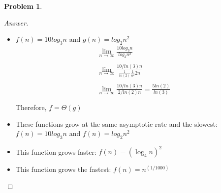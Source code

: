 \documentclass[11pt]{article}
\theoremstyle{definition}
\theoremstyle{definition}
\newtheorem{required}{Problem}
\theoremstyle{definition}
\begin{document}
\begin{required}
\begin{enumerate} [label=(\alph*)]
\begin{proof}[Answer]
\begin{itemize}
\begin{align*}
             \frac{-1}{2(ln(2))^2}\lim_{n \to \infty} \frac{1}{n^{2.001}}= 0 \\
        \end{align*}
        Therefore, $f=O(g)$
        \item $f(n) = 10log_3n$ and $g(n) = log_2n^2$
        \begin{align*}
            \lim_{n \to \infty} \frac{10log_3n}{log_2n^2} \\ \\
             \lim_{n \to \infty} \frac{10/ln(3)n}{\frac{1}{ln(2)}\frac{1}{n^2}2n} \\ \\
             \lim_{n \to \infty} \frac{10/ln(3)n}{2/ln(2)n} = \frac{5ln(2)}{ln(3)}\\ \\
        \end{align*}
        Therefore, $f = \Theta (g)$
    \end{itemize}
    \begin{itemize}
    \item These functions grow at the same asymptotic rate and the slowest:  $f(n) = 10log_3n$ and $f(n) = log_2n^2$
    \item This function grows faster: $f(n) = (\log_4 n)^2$
    \item This function grows the fastest: $f(n) = n ^ {(1/1000)}$
    \end{itemize}
    \end{proof}
\end{enumerate}

\end{required}

\newpage
\end{document}
